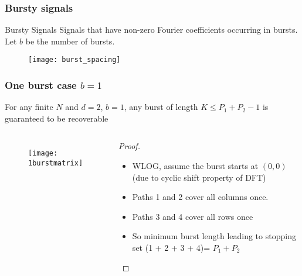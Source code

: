 	
	\begin{frame}\frametitle{Bursty signals}
		\begin{block}{Bursty Signals}
			Signals that have non-zero Fourier coefficients occurring in bursts. Let $b$ be the number of bursts.
		\end{block}
		
		\begin{figure}[t]
			\centering
			\texttt{[image: burst\_spacing]}
		\end{figure}
		
	\end{frame}
	
	\begin{frame}\frametitle{One burst case $b=1$}
		
		\begin{theorem}
			\color{blue} For any finite $N$ and $d=2$, $b=1$, any burst of length $K \leq P_1+P_2-1$ is guaranteed to be recoverable
			
			\begin{columns}
				
				\begin{figure}[t]
					\centering
					\texttt{[image: 1burstmatrix]}
				\end{figure}
				
				\begin{proof}
					\begin{itemize}
						
						
						\item WLOG, assume the burst starts at $(0,0)$ (due to cyclic shift property of DFT)
						\item Paths \alert{1} and \alert{2} cover all columns once.
						\item Paths \alert{3} and \alert{4} cover all rows once
						\item So minimum burst length leading to stopping set (\alert{1 + 2 + 3 + 4})= $P_1 + P_2$
					\end{itemize}
					
				\end{proof}
			\end{columns}
		\end{theorem}
	\end{frame}
	
